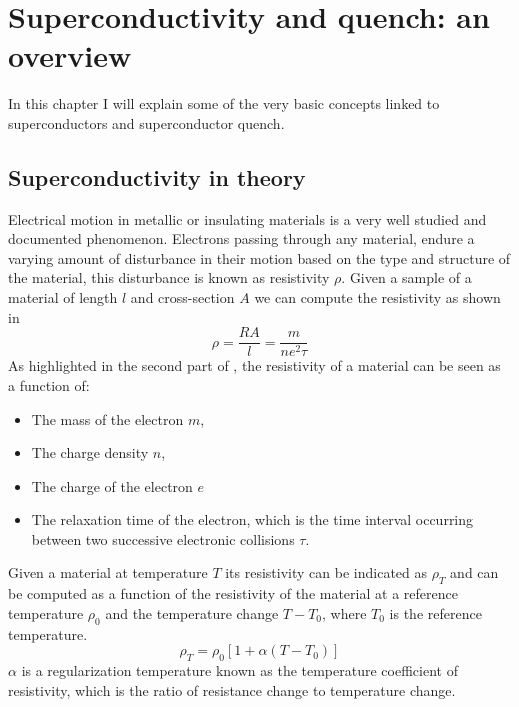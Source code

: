 \chapter{Superconductivity and quench: an overview}
\label{chp:soupcond-quench}
In this chapter I will explain some of the very basic concepts linked to superconductors and
superconductor quench.
\section{Superconductivity in theory}
\label{sec:soupcond}
Electrical motion in metallic or insulating materials is a very well studied and documented
phenomenon. Electrons passing through any material, endure a varying amount of disturbance in their
motion based on the type and structure of the material, this disturbance is known as resistivity $\rho$.
Given a sample of a material of length $l$ and cross-section $A$ we can compute the resistivity as
shown in 
\begin{equation}
	\label{eq:resistivity-cable}
	\rho = \frac{RA}{l} = \frac{m}{ne^2\tau}
\end{equation}
As highlighted in the second part of , the resistivity of a
material can be seen as a function of:
\begin{itemize}
	\item The mass of the electron $m$,
	\item The charge density $n$,
	\item The charge of the electron $e$
	\item The relaxation time of the electron, which is the time interval occurring between two
	      successive electronic collisions $\tau$.
\end{itemize}

Given a material at temperature $T$ its resistivity can be indicated as $\rho_T$ and can be computed
as a function of the resistivity of the material at a reference temperature $\rho_0$ and the
temperature change $T - T_0$, where $T_0$ is the reference temperature.
\begin{equation}
	\label{eq:resistivity-func-of-temp}
	\rho_T = \rho_0[1 + \alpha(T - T_0)]
\end{equation}
$\alpha$ is a regularization temperature known as the temperature coefficient of resistivity, which
is the ratio of resistance change to temperature change.

